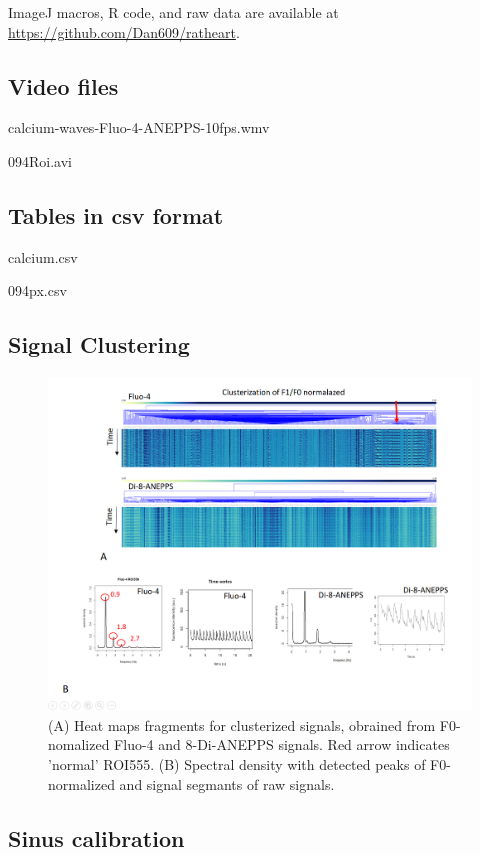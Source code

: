 \documentclass{biophys-new}
\begin{document}
ImageJ macros, R code, and raw data are available at \url{https://github.com/Dan609/ratheart}.

\subsection*{Video files}

calcium-waves-Fluo-4-ANEPPS-10fps.wmv

094Roi.avi

\subsection*{Tables in csv format}

calcium.csv

094px.csv

\subsection*{Signal Clustering}

\begin{figure}
    \includegraphics[width=0.9\linewidth]{fig6.png}
    \caption{(A) Heat maps fragments for clusterized signals, obrained from  F0-nomalized Fluo-4 and 8-Di-ANEPPS signals. Red arrow indicates 'normal' ROI555. (B) Spectral density with detected peaks of F0-normalized and signal segmants of raw signals.}
    \label{fig:fig6}
\end{figure}

\subsection*{Sinus calibration}
\end{document}
